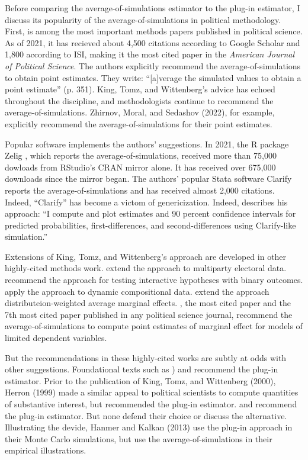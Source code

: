 \documentclass[12pt]{article}
\begin{document}
Before comparing the average-of-simulations estimator to the plug-in estimator, I discuss its popularity of the average-of-simulations in political methodology. First, \cite{KingTomzWittenberg2000} is among the most important methods papers published in political science. As of 2021, it has recieved about 4,500 citations according to Google Scholar and 1,800 according to ISI, making it the most cited paper in the \textit{American Journal of Political Science}. The authors explicitly recommend the average-of-simulations to obtain point estimates. They write: ``[a]verage the simulated values to obtain a point estimate'' (p. 351). King, Tomz, and Wittenberg's advice has echoed throughout the discipline, and methodologists continue to recommend the average-of-simulations. Zhirnov, Moral, and Sedashov (2022), for example, explicitly recommend the average-of-simulations for their point estimates.

Popular software implements the authors' suggestions. In 2021, the R package Zelig \cite{Choiratetal}, which reports the average-of-simulations, received more than 75,000 dowloads from RStudio's CRAN mirror alone. It has received over 675,000 downloads since the mirror began. The authors' popular Stata software Clarify \citep{TomzWittenbergKing2003} reports the average-of-simulations and has received almost 2,000 citations. Indeed, ``Clarify'' has become a victom of genericization. Indeed, \cite{Rainey2016} describes his approach: ``I compute and plot estimates and 90 percent confidence intervals for predicted probabilities, first-differences, and second-differences using Clarify-like simulation.''

Extensions of King, Tomz, and Wittenberg's approach are developed in other highly-cited methods work. \cite{Tomz2002} extend the approach to multiparty electoral data. \cite{BerryDeMerittEsarey2010} recommend the approach for testing interactive hypotheses with binary outcomes. \cite{Philips2016} apply the approach to dynamic compositional data. \cite{Zhirnov2022} extend the approach distributeion-weighted average marginal effects. \cite{BramborClarkGolder2006}, the most cited paper  and the 7th most cited paper published in any political science journal, recommend the average-of-simulations to compute point estimates of marginal effect for models of limited dependent variables.

But the recommendations in these highly-cited works are subtly at odds with other suggestions. Foundational texts such as \citealt[pp.\@ 320--321]{CasellaBerger2002}) and \citealt[p. \@ 521]{Greene2012} recommend the plug-in estimator. Prior to the publication of King, Tomz, and Wittenberg (2000), Herron (1999) made a similar appeal to political scientists to compute quantities of substantive interest, but recommended the plug-in estimator. \cite{King1989} and \cite{KingZeng2002} recommend the plug-in estimator. But none defend their choice or discuss the alternative. Illustrating the devide, Hanmer and Kalkan (2013) use the plug-in approach in their Monte Carlo simulations, but use the average-of-simulations in their empirical illustrations. 
\end{document}
